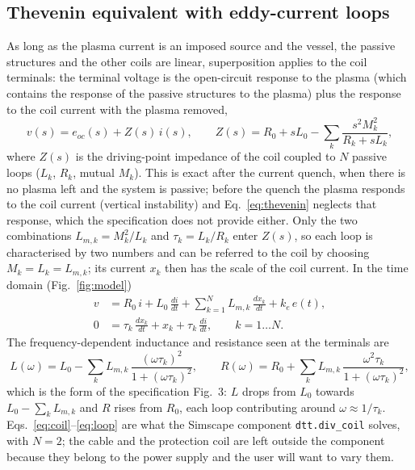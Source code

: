 \documentclass[11pt,a4paper]{article}
\newcommand{\code}[1]{\texttt{#1}}
\begin{document}
\subsection{Thevenin equivalent with eddy-current loops}
\label{sec:thevenin}
As long as the plasma current is an imposed source and the vessel, the passive structures and the other coils are linear, superposition applies to the coil terminals: the terminal voltage is the open-circuit response to the plasma (which contains the response of the passive structures to the plasma) plus the response to the coil current with the plasma removed,
\begin{equation}
v(s) = e_{oc}(s) + Z(s)\, i(s), \qquad Z(s) = R_0 + s L_0 - \sum_k \frac{s^2 M_k^2}{R_k + s L_k},
\label{eq:thevenin}
\end{equation}
where $Z(s)$ is the driving-point impedance of the coil coupled to $N$ passive loops ($L_k$, $R_k$, mutual $M_k$). This is exact after the current quench, when there is no plasma left and the system is passive; before the quench the plasma responds to the coil current (vertical instability) and Eq.~\eqref{eq:thevenin} neglects that response, which the specification does not provide either. Only the two combinations $L_{m,k} = M_k^2/L_k$ and $\tau_k = L_k/R_k$ enter $Z(s)$, so each loop is characterised by two numbers and can be referred to the coil by choosing $M_k = L_k = L_{m,k}$; its current $x_k$ then has the scale of the coil current. In the time domain (Fig.~\ref{fig:model})
\begin{align}
v &= R_0\, i + L_0\, \frac{di}{dt} + \sum_{k=1}^{N} L_{m,k}\, \frac{dx_k}{dt} + k_e\, e(t), \label{eq:coil}\\
0 &= \tau_k\, \frac{dx_k}{dt} + x_k + \tau_k\, \frac{di}{dt}, \qquad k = 1\dots N. \label{eq:loop}
\end{align}
The frequency-dependent inductance and resistance seen at the terminals are
\begin{equation}
L(\omega) = L_0 - \sum_k L_{m,k}\, \frac{(\omega\tau_k)^2}{1 + (\omega\tau_k)^2}, \qquad
R(\omega) = R_0 + \sum_k L_{m,k}\, \frac{\omega^2 \tau_k}{1 + (\omega\tau_k)^2},
\label{eq:LR}
\end{equation}
which is the form of the specification Fig.~3: $L$ drops from $L_0$ towards $L_0 - \sum_k L_{m,k}$ and $R$ rises from $R_0$, each loop contributing around $\omega \approx 1/\tau_k$. Eqs.~\eqref{eq:coil}--\eqref{eq:loop} are what the Simscape component \code{dtt.div\_coil} solves, with $N = 2$; the cable and the protection coil are left outside the component because they belong to the power supply and the user will want to vary them.
\end{document}
